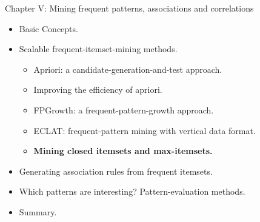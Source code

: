 \documentclass[aspectratio=169,t,xcolor=dvipsnames]{beamer}
\begin{document}
  {
    \begin{frame}{Chapter V: Mining frequent patterns, associations and correlations}
        \begin{itemize}
            \item Basic Concepts.
            \item Scalable frequent-itemset-mining methods.
            \begin{itemize}
              \item Apriori: a candidate-generation-and-test approach.
              \item Improving the efficiency of apriori.
              \item FPGrowth:  a frequent-pattern-growth approach.
              \item ECLAT: frequent-pattern mining with vertical data format.
              \item \textbf{Mining closed itemsets and max-itemsets.}
            \end{itemize}
            \item Generating association rules from frequent itemsets.
            \item Which patterns are interesting? Pattern-evaluation methods.
            \item Summary.
        \end{itemize}
    \end{frame}
  }
\end{document}
